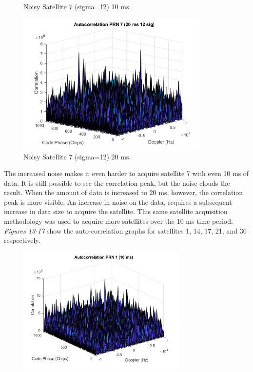 \documentclass[11pt]{article}
\begin{document}
\begin{enumerate}[label=\textbf{\arabic*.}]
\begin{figure}[H]
        \caption{Noisy Satellite 7 (sigma=12) 10 ms.}
    \end{figure}
    \begin{figure}[H]
        \centering
        \includegraphics[width=0.85\textwidth]{Lab_4_PRN7_12sig_20ms.png}
        \caption{Noisy Satellite 7 (sigma=12) 20 ms.}
    \end{figure}
The increased noise makes it even harder to acquire satellite 7 with even 10 ms of data. It is still possible to see the correlation peak, but the noise clouds the result. When the amount of data is increased to 20 ms, however, the correlation peak is more visible. An increase in noise on the data, requires a subsequent increase in data size to acquire the satellite. This same satellite acquisition methodology was used to acquire more satellites over the 10 ms time period. \emph{Figures 13-17} show the auto-correlation graphs for satellites 1, 14, 17, 21, and 30 respectively.
    \begin{figure}[H]
        \centering
        \includegraphics[width=0.75\textwidth]{Lab_4_PRN1_10ms.png}

\end{figure}
\end{enumerate}
\end{document}
